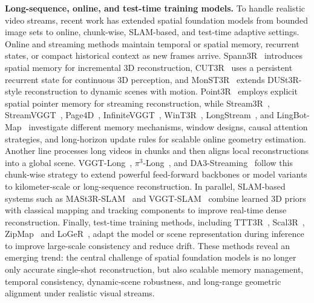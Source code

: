\documentclass{llmxive}
\begin{document}
\textbf{Long-sequence, online, and test-time training models.}
To handle realistic video streams, recent work has extended spatial foundation models from bounded image sets to online, chunk-wise, SLAM-based, and test-time adaptive settings. 
%
Online and streaming methods maintain temporal or spatial memory, recurrent states, or compact historical context as new frames arrive. 
%
Spann3R~\citep{wang2024spann3r} introduces spatial memory for incremental 3D reconstruction, CUT3R~\citep{wang2025cut3r} uses a persistent recurrent state for continuous 3D perception, and MonST3R~\citep{zhang2024monst3r} extends DUSt3R-style reconstruction to dynamic scenes with motion. 
%
Point3R~\citep{point3r} employs explicit spatial pointer memory for streaming reconstruction, while Stream3R~\citep{stream3r2025}, StreamVGGT~\citep{streamVGGT}, Page4D~\citep{zhou2025page4d}, InfiniteVGGT~\citep{yuan2026infinitevggt}, WinT3R~\citep{li2025wint3r}, LongStream~\citep{cheng2026longstream}, and LingBot-Map~\citep{chen2026lingbotmap} investigate different memory mechanisms, window designs, causal attention strategies, and long-horizon update rules for scalable online geometry estimation. 
%
Another line processes long videos in chunks and then aligns local reconstructions into a global scene. VGGT-Long~\citep{deng2025vggtlong}, $\pi^3$-Long~\citep{deng2025vggtlong}, and DA3-Streaming~\citep{deng2025vggtlong} follow this chunk-wise strategy to extend powerful feed-forward backbones or model variants to kilometer-scale or long-sequence reconstruction. 
%
In parallel, SLAM-based systems such as MASt3R-SLAM~\citep{murai2024_mast3rslam} and VGGT-SLAM~\citep{maggio2025vggt-slam} combine learned 3D priors with classical mapping and tracking components to improve real-time dense reconstruction. 
%
Finally, test-time training methods, including TTT3R~\citep{chen2025ttt3r}, Scal3R~\citep{xie2026scal3r}, ZipMap~\citep{jin2026zipmap} and LoGeR~\citep{zhang2026loger}, adapt the model or scene representation during inference to improve large-scale consistency and reduce drift. 
%
These methods reveal an emerging trend: the central challenge of spatial foundation models is no longer only accurate single-shot reconstruction, but also scalable memory management, temporal consistency, dynamic-scene robustness, and long-range geometric alignment under realistic visual streams.
\end{document}
